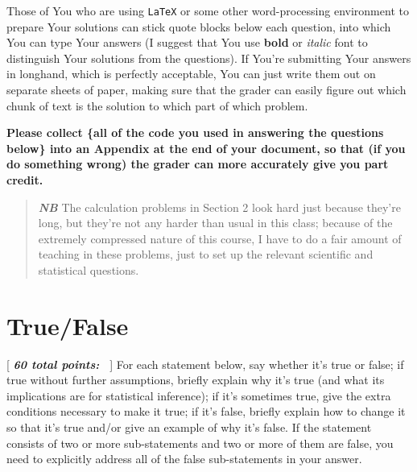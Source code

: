\documentclass[12pt]{article}
\newcommand{\bi}[1]{\textbf{\textit{#1}}}
\begin{document}
Those of You who are using \texttt{LaTeX} or some other word-processing environment to prepare Your solutions can stick quote blocks below each question, into which You can type Your answers (I suggest that You use \textbf{bold} or \textit{italic} font to distinguish Your solutions from the questions). If You're submitting Your answers in longhand, which is perfectly acceptable, You can just write them out on separate sheets of paper, making sure that the grader can easily figure out which chunk of text is the solution to which part of which problem.

\textbf{Please collect \{all of the code you used in answering the questions  below\} into an Appendix at the end of your document, so that (if you do something wrong) the grader can more accurately give you part credit.} 

\begin{quote}

\bi{NB} The calculation problems in Section 2 look hard just because they're long, but they're not any harder than usual in this class; because of the extremely compressed nature of this course, I have to do a fair amount of teaching in these problems, just to set up the relevant scientific and statistical questions. 

\end{quote}

\section{True/False}

[ \bi{60 total points:~} ] \vspace*{0.025in} For each statement below, say whether it's true or false; if true without further assumptions, briefly explain why it's true (and what its implications are for statistical inference); if it's sometimes true, give the extra conditions necessary to make it true; if it's false, briefly explain how to change it so that it's true and/or give an example of why it's false. If the statement consists of two or more sub-statements and two or more of them are false, you need to explicitly address all of the false sub-statements in your answer. \vspace*{-0.1in}
\end{document}
